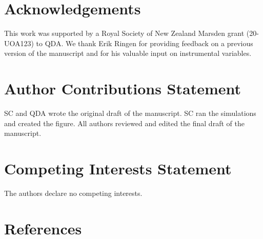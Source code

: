 \documentclass[
  man, donotrepeattitle,floatsintext]{apa6}
\begin{document}
\hypertarget{acknowledgements}{%
\section{Acknowledgements}\label{acknowledgements}}

This work was supported by a Royal Society of New Zealand Marsden grant
(20-UOA123) to QDA. We thank Erik Ringen for providing feedback on a previous
version of the manuscript and for his valuable input on instrumental variables.

\hypertarget{author-contributions-statement}{%
\section{Author Contributions Statement}\label{author-contributions-statement}}

SC and QDA wrote the original draft of the manuscript. SC ran the simulations
and created the figure. All authors reviewed and edited the final draft of the
manuscript.

\hypertarget{competing-interests-statement}{%
\section{Competing Interests Statement}\label{competing-interests-statement}}

The authors declare no competing interests.

\newpage

\hypertarget{references}{%
\section{References}\label{references}}

\begingroup
\end{document}
